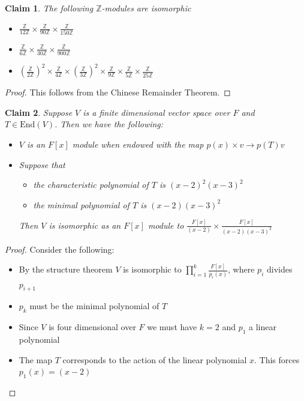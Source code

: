 \documentclass[a4paper,11pt]{article}
\newtheorem{claim}{Claim}
\begin{document}
\begin{claim}
  The following $\mathbb{Z}$-modules are isomorphic
  
  \begin{itemize}
    \item $\frac{\mathbb{Z}}{12\mathbb{Z}} \times \frac{\mathbb{Z}}{90\mathbb{Z}} \times \frac{\mathbb{Z}}{150\mathbb{Z}}$
    \item $\frac{\mathbb{Z}}{6\mathbb{Z}} \times \frac{\mathbb{Z}}{30\mathbb{Z}} \times \frac{\mathbb{Z}}{900\mathbb{Z}}$
    \item $\left(\frac{\mathbb{Z}}{2\mathbb{Z}} \right)^2 \times \frac{\mathbb{Z}}{4\mathbb{Z}} \times 
           \left(\frac{\mathbb{Z}}{3\mathbb{Z}}\right)^2 \times \frac{\mathbb{Z}}{9\mathbb{Z}}  \times 
           \frac{\mathbb{Z}}{5\mathbb{Z}} \times \frac{\mathbb{Z}}{25\mathbb{Z}}$
  \end{itemize}
  
\end{claim}

\begin{proof}
  This follows from the Chinese Remainder Theorem.
\end{proof}

\begin{claim}
  Suppose $V$ is a finite dimensional vector space over $F$ and \\ $T \in \text{End}(V)$. Then we have the following:
  \begin{itemize}
    \item $V$ is an $F[x]$ module when endowed with the map $p(x) \times v \to p(T)v$
    \item Suppose that
          \begin{itemize}
            \item the characteristic polynomial of $T$ is $(x-2)^2(x-3)^2$
            \item the minimal polynomial of $T$ is $(x-2)(x-3)^2$
          \end{itemize}
          Then $V$ is isomorphic as an $F[x]$ module to $\frac{F[x]}{(x-2)} \times \frac{F[x]}{(x-2)(x-3)^2}$
  \end{itemize}
\end{claim}

\begin{proof}
  Consider the following:
  \begin{itemize}
    \item By the structure theorem $V$ is isomorphic to $\prod_{i=1}^k \frac{F[x]}{p_i(x)}$, where $p_i$ divides $p_{i+1}$
    \item $p_k$ must be the minimal polynomial of $T$
    \item Since $V$ is four dimensional over $F$ we must have $k=2$ and $p_1$ a linear polynomial 
    \item The map $T$ corresponds to the action of the linear polynomial $x$. This forces $p_1(x)=(x-2)$
  \end{itemize}
\end{proof}
\end{document}
